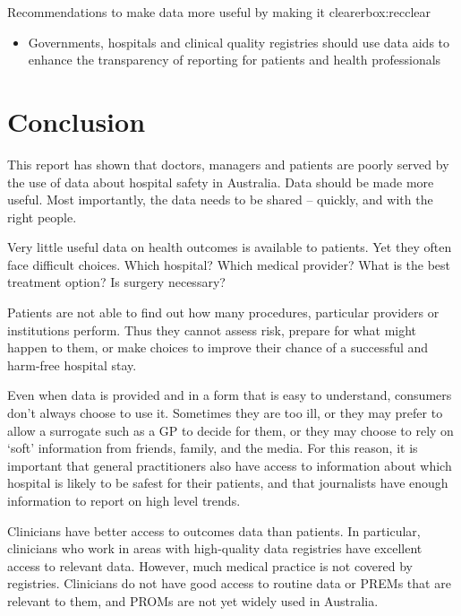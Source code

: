 \documentclass[FrontPage]{grattan}
\begin{document}
\begin{addsmallbox}[H]{Recommendations to make data more useful by making it clearer}{box:recclear}
\begin{itemize}[leftmargin=*]
    \item Governments, hospitals and clinical quality registries should use data aids to enhance the transparency of reporting for patients and health professionals
\end{itemize}
\end{addsmallbox}

\chapter{Conclusion}\label{chap:conc}
This report has shown that doctors, managers and patients are poorly served by the use of data about hospital safety in Australia. Data should be made more useful. Most importantly, the data needs to be shared -- quickly, and with the right people.
\CenturyFootnote

Very little useful data on health outcomes is available to patients. Yet they often face difficult choices. Which hospital? Which medical provider? What is the best treatment option? Is surgery necessary? 

Patients are not able to find out how many procedures, particular providers or institutions perform. Thus they cannot assess risk, prepare for what might happen to them, or make choices to improve their chance of a successful and harm-free hospital stay. 

Even when data is provided and in a form that is easy to understand, consumers don’t always choose to use it. Sometimes they are too ill, or they may prefer to allow a surrogate such as a GP to decide for them, or they may choose to rely on `soft' information from friends, family, and the media. For this reason, it is important that general practitioners also have access to information about which hospital is likely to be safest for their patients, and that journalists have enough information to report on high level trends.

Clinicians have better access to outcomes data than patients. In particular, clinicians who work in areas with high-quality data registries have excellent access to relevant data. However, much medical practice is not covered by registries. Clinicians do not have good access to routine data or PREMs that are relevant to them, and PROMs are not yet widely used in Australia.
 
\end{document}
